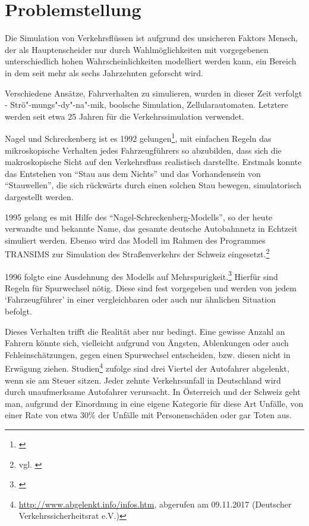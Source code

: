 \section{Problemstellung}
\label{sec:problemstellung}


Die Simulation von Verkehrsflüssen ist aufgrund des unsicheren Faktors Mensch, der als Hauptenscheider nur durch Wahlmöglichkeiten mit vorgegebenen unterschiedlich hohen Wahrscheinlichkeiten modelliert werden kann, ein Bereich in dem seit mehr als sechs Jahrzehnten geforscht wird.

Verschiedene Ansätze, Fahrverhalten zu simulieren, wurden in dieser Zeit verfolgt - Strö"-mungs"-dy"-na"-mik, boolsche Simulation, Zellularautomaten. Letztere werden seit etwa 25 Jahren für die Verkehrssimulation verwendet.

Nagel und Schreckenberg ist es 1992 gelungen\footnote{\cite{na-sch}}, mit einfachen Regeln das mikroskopische Verhalten jedes Fahrzeugführers so abzubilden, dass sich die makroskopische Sicht auf den Verkehrsfluss realistisch darstellte.
Erstmals konnte das Entstehen von \enquote{Stau aus dem Nichts} und das Vorhandensein von \enquote{Stauwellen}, die sich rückwärts durch einen solchen Stau bewegen, simulatorisch dargestellt werden.

1995 gelang es mit Hilfe des \enquote{Nagel-Schreckenberg-Modells}, so der heute verwandte und bekannte Name, das gesamte deutsche Autobahnnetz in Echtzeit simuliert werden. 
Ebenso wird das Modell im Rahmen des Programmes TRANSIMS zur Simulation des Straßenverkehrs der Schweiz eingesetzt.\footnote{vgl. \cite{spahn-da}}

1996 folgte eine Ausdehnung des Modells auf Mehrspurigkeit.\footnote{\cite{multi-lane}} 
Hierfür sind Regeln für Spurwechsel nötig.
Diese sind fest vorgegeben und werden von jedem \enquote*{Fahrzeugführer} in einer vergleichbaren oder auch nur ähnlichen Situation befolgt.

Dieses Verhalten trifft die Realität aber nur bedingt.
Eine gewisse Anzahl an Fahrern könnte sich, vielleicht aufgrund von Ängsten, Ablenkungen oder auch Fehleinschätzungen, gegen einen Spurwechsel entscheiden, bzw. diesen nicht in Erwägung ziehen.
Studien\footnote{\url{http://www.abgelenkt.info/infos.htm}, abgerufen am 09.11.2017 (Deutscher Verkehrssicherheitsrat e.V.)} zufolge sind drei Viertel der Autofahrer abgelenkt, wenn sie am Steuer sitzen. 
Jeder zehnte Verkehrsunfall in Deutschland wird durch unaufmerksame Autofahrer verursacht. 
In Österreich und der Schweiz geht man, aufgrund der Einordnung in eine eigene Kategorie für diese Art Unfälle, von einer Rate von etwa 30\% der Unfälle mit Personenschäden oder gar Toten aus.

